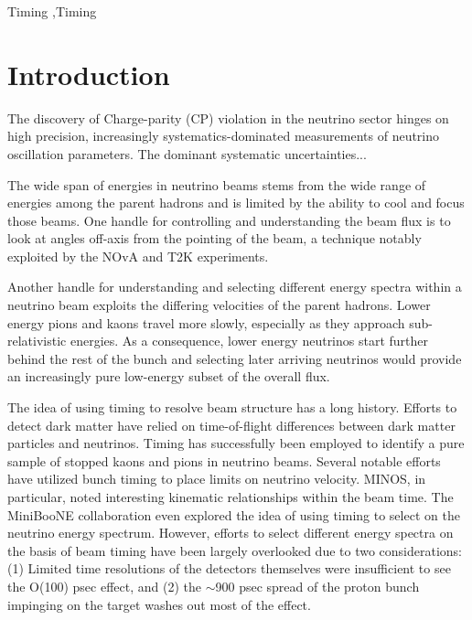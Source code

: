 \documentclass[preprint,12pt]{elsarticle}
\begin{document}
\begin{frontmatter}
\begin{abstract}
\end{abstract}



\begin{keyword}
Timing \sep Timing


\end{keyword}

\end{frontmatter}

\linenumbers

\section{Introduction}
\label{sec:intro}

The discovery of Charge-parity (CP) violation in the neutrino sector hinges on high precision, increasingly systematics-dominated measurements of neutrino oscillation parameters. The dominant systematic uncertainties...

The wide span of energies in neutrino beams stems from the wide range of energies among the parent hadrons and is limited by the ability to cool and focus those beams. One handle for controlling and understanding the beam flux is to look at angles off-axis from the pointing of the beam, a technique notably exploited by the NOvA and T2K experiments.

Another handle for understanding and selecting different energy spectra within a neutrino beam exploits the differing velocities of the parent hadrons. Lower energy pions and kaons travel more slowly, especially as they approach sub-relativistic energies. As a consequence, lower energy neutrinos start further behind the rest of the bunch and selecting later arriving neutrinos would provide an increasingly pure low-energy subset of the overall flux.

The idea of using timing to resolve beam structure has a long history. Efforts to detect dark matter have relied on time-of-flight differences between dark matter particles and neutrinos. Timing has successfully been employed to identify a pure sample of stopped kaons and pions in neutrino beams. Several notable efforts have utilized bunch timing to place limits on neutrino velocity. MINOS, in particular, noted interesting kinematic relationships within the beam time. The MiniBooNE collaboration even explored the idea of using timing to select on the neutrino energy spectrum. However, efforts to select different energy spectra on the basis of beam timing have been largely overlooked due to two considerations: (1) Limited time resolutions of the detectors themselves were insufficient to see the O(100) psec effect, and (2) the $\sim$900 psec spread of the proton bunch impinging on the target washes out most of the effect.
\end{document}
